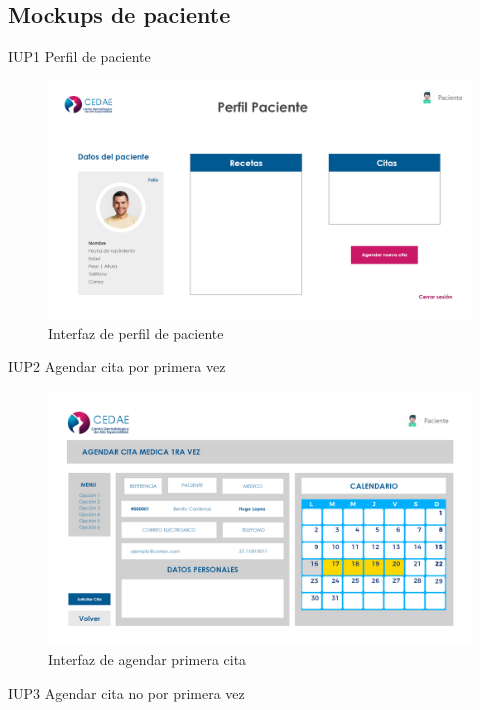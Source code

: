 \documentclass[12pt,letterpaper]{article}
\begin{document}
        \subsection{Mockups de paciente}
        IUP1 Perfil de paciente
            \begin{figure}[H]
                \centering
                \includegraphics [scale=0.19]{interfaces/pac_perfil}
                \caption{Interfaz de perfil de paciente}
            \end{figure}
        IUP2 Agendar cita por primera vez
            \begin{figure}[H]
                \centering
                \includegraphics [scale=0.18]{interfaces/pac_cita_primera}
                \caption{Interfaz de agendar primera cita}
            \end{figure}
        IUP3 Agendar cita no por primera vez
\end{document}
